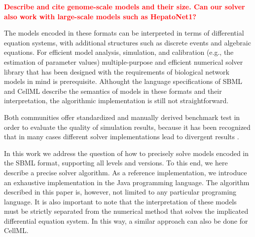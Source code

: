 \documentclass[10pt]{bmc_article}
\newenvironment{bmcformat}{\baselineskip20pt\sloppy\setboolean{publ}{false}}{\baselineskip20pt\sloppy}
\newcommand{\TODO}[1]{\textcolor{red}{\textbf{#1}}}
\begin{document}
\begin{bmcformat}
\TODO{Describe and cite genome-scale models and their size. Can our solver also
work with large-scale models such as HepatoNet1?}

The models encoded in these formats can be interpreted in terms of differential
equation systems, with additional structures such as discrete events and
algebraic equations. 
For efficient model analysis, simulation, and calibration (e.g.,
the estimation of parameter values) multiple-purpose and efficient numerical
solver library that has been designed with the requirements of biological
network models in mind is prerequisite.
Althought the language specifications of SBML \cite{Hucka2001, Hucka2003,
Finney2003a, Finney2006, Hucka2007, Hucka2008, Hucka2010a} 
and CellML \cite{Cuellar2006} describe the semantics of models in these formats
and their interpretation, the algorithmic implementation is still not
straightforward. 

Both communities offer standardized and manually derived benchmark test in order
to evaluate the quality of simulation results, because it has been recognized that in many cases
different solver implementations lead to divergent results \cite{Bergmann2008}.

In this work we address the question of how to precisely solve models encoded in
the SBML format, supporting all levels and versions. To this end, we here
describe a precise solver algorithm. As a reference implementation, we
introduce an exhaustive implementation in the Java\texttrademark{} programming
language. The algorithm described in this paper is, however, not limited to any
particular programing language. It is also important to note that the
interpretation of these models must be strictly separated from the numerical
method that solves the implicated differential equation system. In this way, a
similar approach can also be done for CellML.


\end{bmcformat}
\end{document}
